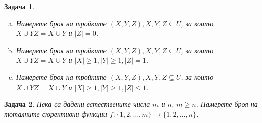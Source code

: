 \documentclass[a4paper]{article}
\newtheorem{problem}{Задача}
\begin{document}
\begin{problem}
\begin{enumerate}[a)]
    Намерете броя на двойките $(X,Y), X,Y\subseteq U$, за които $|(X\setminus Y)\cup(Y\setminus X)| = 1$ и 
    $|X|\geq 2, |Y|\geq 2$;
  \item
    Намерете броя на тройките $(X,Y,Z), X,Y,Z\subseteq U$, за които $X\cup Y\overline{Z} = \overline{X}\cup\overline{Y}$ и
    $|Z| = 0$.
  \item
    Намерете броя на тройките $(X,Y,Z), X,Y,Z\subseteq U$, за които $X\cup Y\overline{Z} = \overline{X}\cup\overline{Y}$ и
    $|X|\geq 1, |Y|\geq 1, |Z| = 1$.
  \item
    Намерете броя на тройките $(X,Y,Z), X,Y,Z\subseteq U$, за които $X\cup Y\overline{Z} = \overline{X}\cup\overline{Y}$ и
    $|X|\geq 1, |Y|\geq 1, |Z|\leq 1$.
  \end{enumerate}
\end{problem}

\begin{problem}
  Нека са дадени естествените числа $m$ и $n$, $m\geq n$.
  Намерете броя на тоталните {\em сюрективни} функции $f:\{1,2,\dots,m\}\to\{1,2,\dots,n\}$.
\end{problem}
\end{document}
